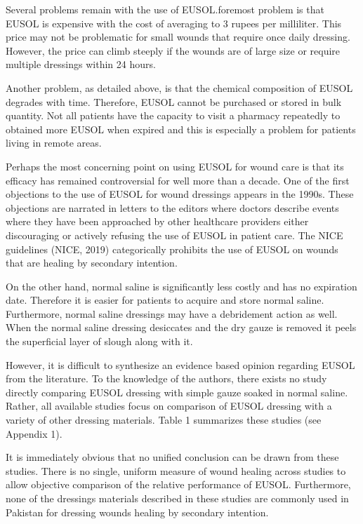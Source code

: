 \documentclass{article}
\begin{document}
Several problems remain with the use of EUSOL.\@The foremost problem is that EUSOL is expensive with the cost of averaging to 3 rupees per milliliter. This price may not be problematic for small wounds that require once daily dressing. However, the price can climb steeply if the wounds are of large size or require multiple dressings within 24 hours.

Another problem, as detailed above, is that the chemical composition of EUSOL
degrades with time. Therefore, EUSOL cannot be purchased or stored in bulk
quantity. Not all patients have the capacity to visit a pharmacy repeatedly to
obtained more EUSOL when expired and this is especially a problem for patients living in remote areas.

Perhaps the most concerning point on using EUSOL for wound care is that its
efficacy has remained controversial for well more than a decade. One of the
first objections to the use of EUSOL for wound dressings appears in the
1990s.\cite{Burton_1992,Patton_1992} These objections are narrated in letters to
the editors where doctors describe events where they have been approached by
other healthcare providers either discouraging or actively refusing the use of
EUSOL in patient care. The NICE guidelines (NICE, 2019) categorically prohibits the use of EUSOL on wounds that are healing by secondary intention.

On the other hand, normal saline is significantly less costly and has no
expiration date. Therefore it is easier for patients to acquire and store normal
saline. Furthermore, normal saline dressings may have a debridement action as
well. When the normal saline dressing desiccates and the dry gauze is removed it peels the superficial layer of slough along with it.

However, it is difficult to synthesize an evidence based opinion regarding EUSOL from the literature. To the knowledge of the authors, there exists no study directly comparing EUSOL dressing with simple gauze soaked in normal saline. Rather, all available studies focus on comparison of EUSOL dressing with a variety of other dressing materials. Table 1 summarizes these studies (see Appendix 1).

It is immediately obvious that no unified conclusion can be drawn from these
studies. There is no single, uniform measure of wound healing across studies to
allow objective comparison of the relative performance of  EUSOL. Furthermore, none of the dressings materials described in these studies are commonly used in Pakistan for dressing wounds healing by secondary intention.
\end{document}
